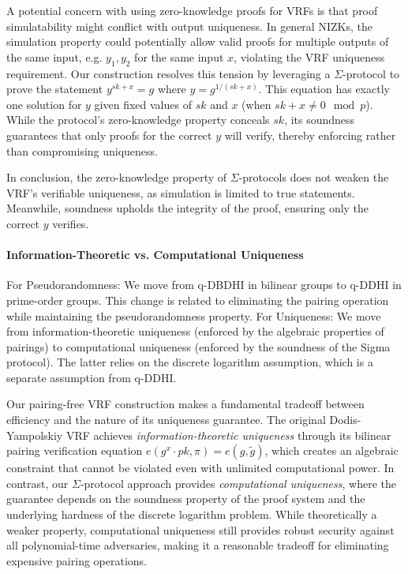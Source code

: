 A potential concern with using zero-knowledge proofs for VRFs is that proof simulatability might conflict with output uniqueness. In general NIZKs, the simulation property could potentially allow valid proofs for multiple outputs of the same input, e.g. $y_1, y_2$ for the same input $x$, violating the VRF uniqueness requirement. Our construction resolves this tension by leveraging a $\Sigma$-protocol to prove the statement $y^{sk + x} = g$ where $y = g^{1/(sk + x)}$. This equation has exactly one solution for $y$ given fixed values of $sk$ and $x$ (when $sk + x \neq 0 \mod p$). While the protocol's zero-knowledge property conceals $sk$, its soundness guarantees that only proofs for the correct $y$ will verify, thereby enforcing rather than compromising uniqueness.


In conclusion, the zero-knowledge property of $\Sigma$-protocols does not weaken the VRF's verifiable uniqueness, as simulation is limited to true statements. Meanwhile, soundness upholds the integrity of the proof, ensuring only the correct $y$ verifies.

\paragraph{Information-Theoretic vs. Computational Uniqueness} 
For Pseudorandomness: We move from q-DBDHI in bilinear groups to q-DDHI in prime-order groups. This change is related to eliminating the pairing operation while maintaining the pseudorandomness property.
For Uniqueness: We move from information-theoretic uniqueness (enforced by the algebraic properties of pairings) to computational uniqueness (enforced by the soundness of the Sigma protocol). The latter relies on the discrete logarithm assumption, which is a separate assumption from q-DDHI.


Our pairing-free VRF construction makes a fundamental tradeoff between efficiency and the nature of its uniqueness guarantee. The original Dodis-Yampolskiy VRF achieves \emph{information-theoretic uniqueness} through its bilinear pairing verification equation $e(g^x \cdot pk, \pi) = e(g, \tilde{g})$, which creates an algebraic constraint that cannot be violated even with unlimited computational power. In contrast, our $\Sigma$-protocol approach provides \emph{computational uniqueness}, where the guarantee depends on the soundness property of the proof system and the underlying hardness of the discrete logarithm problem. While theoretically a weaker property, computational uniqueness still provides robust security against all polynomial-time adversaries, making it a reasonable tradeoff for eliminating expensive pairing operations.


